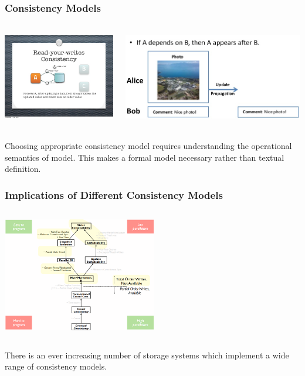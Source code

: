 \documentclass{beamer}
\begin{document}
\begin{frame}
\frametitle{Consistency Models}

\begin{columns}
	
	\includegraphics[height=4cm]{rywmodel.png}
	
	\includegraphics[height=4cm]{causalmodel.png}
\end{columns}
Choosing appropriate consistency model requires understanding the operational  semantics of model. This makes a formal model necessary rather than textual definition.

\end{frame}

\begin{frame}
\frametitle{Implications of Different Consistency Models}
\begin{columns}
	
	
	\includegraphics[height=5cm]{implications.png}
\end{columns}
There is an ever increasing number of storage systems which implement a wide range of consistency models. 

\end{frame}
\end{document}
